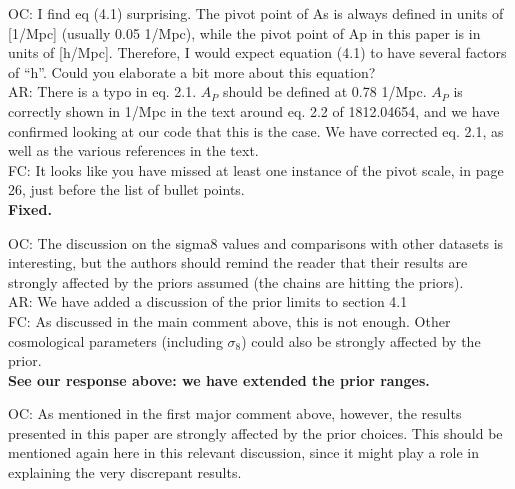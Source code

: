 \documentclass[12pt]{article}
\begin{document}
OC: I find eq (4.1) surprising. The pivot point of As is always defined in units of [1/Mpc] (usually 0.05 1/Mpc), while the pivot point of Ap in this paper is in units of [h/Mpc]. Therefore, I would expect equation (4.1) to have several factors of “h”. Could you elaborate a bit more about this equation?\\

AR: There is a typo in eq. 2.1. $A_P$ should be defined at 0.78 1/Mpc. $A_P$ is correctly shown in 1/Mpc in the text around eq. 2.2 of 1812.04654, and we have confirmed looking at our code that this is the case. We have corrected eq. 2.1, as well as the various references in the text.\\

FC: It looks like you have missed at least one instance of the pivot scale, in page 26, just before the list of bullet points.\\

\textbf{Fixed.}\\

\hrulefill \newline

OC: The discussion on the sigma8 values and comparisons with other datasets is interesting, but the authors should remind the reader that their results are strongly affected by the priors assumed (the chains are hitting the priors).\\

AR: We have added a discussion of the prior limits to section 4.1\\

FC: As discussed in the main comment above, this is not enough. Other cosmological parameters (including $\sigma_8$) could also be strongly affected by the prior.\\

\textbf{See our response above: we have extended the prior ranges.}\\

\hrulefill \newline

OC: As mentioned in the first major comment above, however, the results presented in this paper are strongly affected by the prior choices. This should be mentioned again here in this relevant discussion, since it might play a role in explaining the very discrepant results.\\
\end{document}
